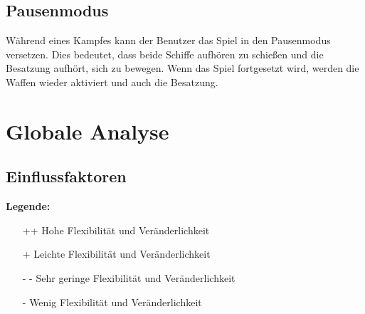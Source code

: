 \documentclass[fontsize=12pt,paper=a4,twoside]{scrartcl}
\begin{document}
\subsection{Pausenmodus}
Während eines Kampfes kann der Benutzer das Spiel in den Pausenmodus versetzen. Dies bedeutet, dass beide Schiffe aufhören zu schießen und die Besatzung aufhört, sich zu bewegen. Wenn das Spiel fortgesetzt wird, werden die Waffen wieder aktiviert und auch die Besatzung.
\newpage
\section{Globale Analyse} \label{sec:globale_analyse}



\subsection{Einflussfaktoren} \label{sec:einflussfaktoren}
\textbf{Legende:}
\begin{itemize}
    \item[++] Hohe Flexibilität und Veränderlichkeit
    \item[ + ] Leichte Flexibilität und Veränderlichkeit
    \item[- - ] Sehr geringe Flexibilität und Veränderlichkeit
    \item[-   ] Wenig Flexibilität und Veränderlichkeit
  \end{itemize}
  \vspace*{20mm}
  


\end{document}
